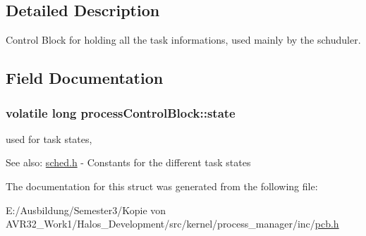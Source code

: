\subsection{Detailed Description}
Control Block for holding all the task informations, used mainly by the schuduler. 

\subsection{Field Documentation}
\hypertarget{structprocess_control_block_b4db55d4f01fe77a8afe8debb9c701fd}{
\subsubsection[{state}]{\setlength{\rightskip}{0pt plus 5cm}volatile long {\bf processControlBlock::state}}}
\label{structprocess_control_block_b4db55d4f01fe77a8afe8debb9c701fd}


used for task states, 

\begin{Desc}
\item[See also:]\hyperlink{sched_8h}{sched.h} - Constants for the different task states \end{Desc}


The documentation for this struct was generated from the following file:\begin{CompactItemize}
\item 
E:/Ausbildung/Semester3/Kopie von AVR32\_\-Work1/Halos\_\-Development/src/kernel/process\_\-manager/inc/\hyperlink{pcb_8h}{pcb.h}\end{CompactItemize}
